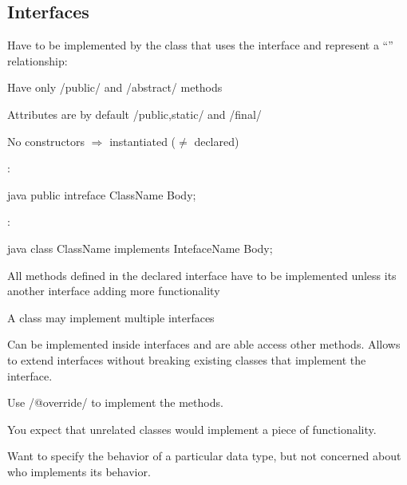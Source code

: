 \subsection{Interfaces}
\begin{defnbox}\nospacing
  \begin{defn}[Interfaces=pure abstract class]\label{defn:interfaces}
    Have to be implemented by the class that uses the interface and represent a
    ``'' relationship:
    \begin{itemizenosep}
      \item Have only \javainline/public/ and \javainline/abstract/ methods
      \item Attributes are by default \javainline/public,static/ and
    \javainline/final/
      \item No constructors $\Rightarrow$ instantiated ($\neq$ declared)
    \end{itemizenosep}
    :
    \begin{mintlinebox}{java}
      public intreface ClassName{ Body; }
    \end{mintlinebox}
    :
    \begin{mintlinebox}{java}
      class ClassName implements IntefaceName{ Body; }
    \end{mintlinebox}
    \begin{itemizenosep}
        \item All methods defined in the declared interface have to be
      implemented unless its another interface adding more functionality
        \item A class may implement multiple interfaces
    \end{itemizenosep}
  \end{defn}
\end{defnbox}
\begin{notebox}\nospacing
  Can be implemented inside interfaces and are able access other methods.
  Allows to extend interfaces without breaking existing classes that implement
  the interface.
\end{notebox}
\begin{stylebox}\nospacing
  Use \javainline/@override/ to implement the methods.
\end{stylebox}
\begin{stylebox}[Usage]\nospacing
  \begin{itemizenosep}
    \item You expect that unrelated classes would implement a piece of
  functionality. 
    \item Want to specify the behavior of a particular data type, but not concerned about who implements its behavior.
  \end{itemizenosep}
\end{stylebox}
